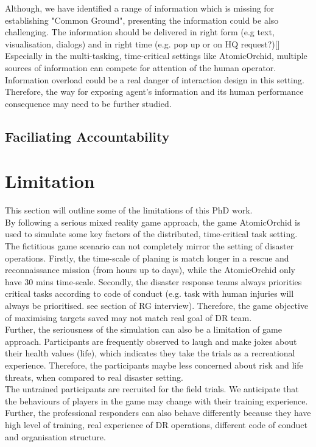 Although, we have identified a range of information which is missing for establishing "Common Ground", presenting the information could be also challenging. The information should be delivered in right form (e.g text, visualisation, dialogs) and in right time (e.g. pop up or on HQ request?)[] Especially in the multi-tasking, time-critical settings like AtomicOrchid, multiple sources of information can compete for attention of the human operator. Information overload could be a real danger of interaction design in this setting. Therefore, the  way for exposing agent's information and its human performance consequence may need to be further studied.   \\

\subsection{Faciliating Accountability}\label{sec:conclusionAC}

\section{Limitation}
This section will outline some of the limitations of this PhD work. \\

By following a serious mixed reality game approach, the game AtomicOrchid is used to simulate some key factors of the distributed, time-critical task setting.  The fictitious game scenario can not completely mirror the setting of disaster operations. Firstly, the time-scale of planing is match longer in a rescue and reconnaissance mission (from hours up to days), while the AtomicOrchid only have 30 mins time-scale. Secondly, the disaster response teams always priorities critical tasks according to code of conduct (e.g. task with human injuries will always be prioritised. see section of RG interview). Therefore, the game objective of maximising targets saved may not match real goal of DR team.  \\

Further, the seriousness of the simulation can also be a limitation of game approach. Participants are frequently observed to laugh and make jokes about their health values (life), which indicates they take the trials as a recreational experience. Therefore, the participants maybe less concerned about risk and life threats, when compared to real disaster setting. \\

The untrained participants are recruited for the field trials. We anticipate that the behaviours of players in the game may change with their training experience. Further, the professional responders can also behave differently because they have high level of training, real experience of DR operations, different code of conduct and organisation structure.\\

